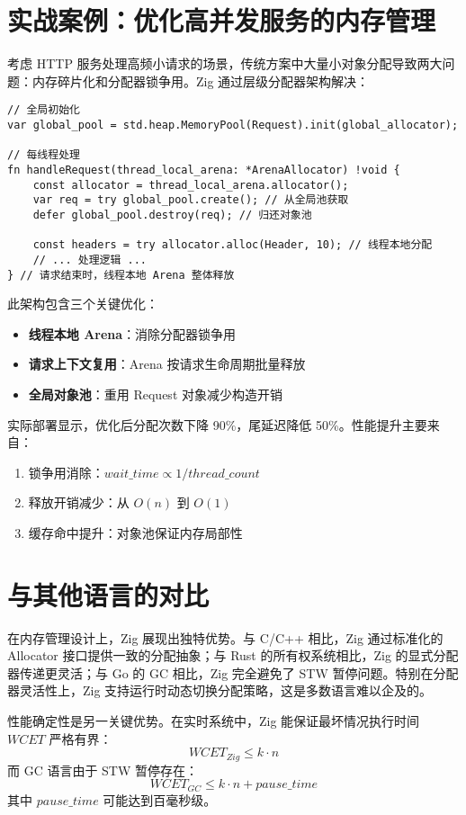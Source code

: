\chapter{实战案例：优化高并发服务的内存管理}
考虑 HTTP 服务处理高频小请求的场景，传统方案中大量小对象分配导致两大问题：内存碎片化和分配器锁争用。Zig 通过层级分配器架构解决：\par
\begin{lstlisting}[language=zig]
// 全局初始化
var global_pool = std.heap.MemoryPool(Request).init(global_allocator);

// 每线程处理
fn handleRequest(thread_local_arena: *ArenaAllocator) !void {
    const allocator = thread_local_arena.allocator();
    var req = try global_pool.create(); // 从全局池获取
    defer global_pool.destroy(req); // 归还对象池

    const headers = try allocator.alloc(Header, 10); // 线程本地分配
    // ... 处理逻辑 ...
} // 请求结束时，线程本地 Arena 整体释放
\end{lstlisting}
此架构包含三个关键优化：\par
\begin{itemize}
\item \textbf{线程本地 Arena}：消除分配器锁争用
\item \textbf{请求上下文复用}：Arena 按请求生命周期批量释放
\item \textbf{全局对象池}：重用 Request 对象减少构造开销
\end{itemize}
实际部署显示，优化后分配次数下降 90\%{}，尾延迟降低 50\%{}。性能提升主要来自：\par
\begin{enumerate}
\item 锁争用消除：$wait\_time \propto 1/thread\_count$
\item 释放开销减少：从 $O(n)$ 到 $O(1)$
\item 缓存命中提升：对象池保证内存局部性
\end{enumerate}
\chapter{与其他语言的对比}
在内存管理设计上，Zig 展现出独特优势。与 C/C++ 相比，Zig 通过标准化的 Allocator 接口提供一致的分配抽象；与 Rust 的所有权系统相比，Zig 的显式分配器传递更灵活；与 Go 的 GC 相比，Zig 完全避免了 STW 暂停问题。特别在分配器灵活性上，Zig 支持运行时动态切换分配策略，这是多数语言难以企及的。\par
性能确定性是另一关键优势。在实时系统中，Zig 能保证最坏情况执行时间 $WCET$ 严格有界：
$$WCET_{Zig} \leq k \cdot n$$
而 GC 语言由于 STW 暂停存在：
$$WCET_{GC} \leq k \cdot n + pause\_time$$
其中 $pause\_time$ 可能达到百毫秒级。\par
